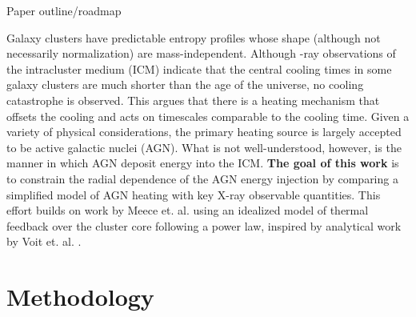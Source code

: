 \documentclass[iop,apjl, twocolappendix]{emulateapj}   %
\begin{document}
\textbullet Paper outline/roadmap

Galaxy clusters have predictable entropy profiles whose shape (although not
necessarily normalization) are mass-independent.
\cite{cavagnolo_intracluster_2009} Although -ray observations of the
intracluster medium (ICM) indicate that the central cooling times  in some
galaxy clusters are much shorter than the age of the universe, no cooling
catastrophe is observed. This argues that there is a heating mechanism that
offsets the cooling and acts on timescales comparable to the cooling time.
Given a variety of physical considerations, the primary heating source is
largely accepted to be active galactic nuclei (AGN).  What is not
well-understood, however, is the manner in which AGN deposit energy into the
ICM.   \textbf{The goal of this work} is to constrain the radial dependence of
the AGN energy injection by comparing a simplified model of AGN heating with
key X-ray observable quantities. This effort builds on work by Meece et. al.
\cite{meece_jr_agn_2016,meece_triggering_2017} using an idealized model of
thermal feedback over the cluster core following a power law, inspired by
analytical work by Voit et. al.
\cite{voit_global_2017}.

\section{Methodology}
\label{sec:methodology}
\end{document}
